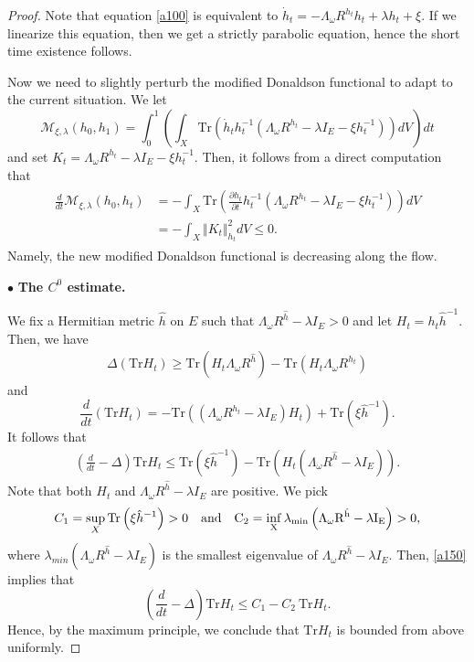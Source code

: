 \documentclass[11pt]{amsart}
\numberwithin{equation}{section}
\theoremstyle{remark}
\newcommand{\pa}{\partial}
\newcommand{\M}{{\mathcal M}}
\newcommand{\lb}{\left (}
\newcommand{\rb}{\right )}
\newcommand{\tr}{\text{Tr}}
\begin{document}
\begin{proof}
Note that equation \eqref{a100} is equivalent to $\dot h_t=-\Lambda_\omega R^{h_t}h_t+\lambda h_t+\xi$. If we linearize this equation, then we get a strictly parabolic equation, hence the short time existence follows.

Now we need to slightly perturb the modified Donaldson functional to adapt to the current situation. We let
\[
\M_{\xi,\lambda}\lb h_0,h_1\rb=\int_0^1 \lb \int_X \tr \lb \dot h_t h_t^{-1}\lb \Lambda_\omega R^{h_t}-\lambda I_E-\xi h_t^{-1}\rb\rb dV\rb dt
\]
and set $K_t=\Lambda_\omega R^{h_t}-\lambda I_E-\xi h_t^{-1}$. Then, it follows from a direct computation that
\begin{align*}
\begin{split}
\frac{d}{dt}\M_{\xi,\lambda}\lb h_0,h_t\rb & =-\int_X \tr\lb\frac{\pa h_t}{\pa t}h_t^{-1} \lb \Lambda_\omega R^{h_t}-\lambda I_E-\xi h_t^{-1}\rb\rb dV \\
& =-\int_X \Vert K_t\Vert_{h_t}^2 dV\leq 0.
\end{split}
\end{align*}
Namely, the new modified Donaldson functional is decreasing along the flow.

\medskip
\noindent $\bullet$  \textbf{The $C^0$ estimate.}

\smallskip

We fix a Hermitian metric $\hat h$ on $E$ such that $\Lambda_\omega R^{\hat h}-\lambda I_E>0$ and let $H_t=h_t\hat h^{-1}$. Then, we have
\begin{eqnarray}\label{a140}
\Delta \lb \tr H_t\rb \geq \tr \lb H_t \Lambda_\omega R^{\hat h}\rb-\tr \lb H_t \Lambda_\omega R^{h_t}\rb
\end{eqnarray}
and
\[
\frac{d}{dt} \lb \tr H_t\rb =-\tr \lb \lb\Lambda_\omega R^{h_t}-\lambda I_E\rb H_t \rb+\tr\lb \xi \hat h^{-1}\rb.
\]
It follows that
\begin{eqnarray}\label{a150}
\lb \frac{d}{dt}-\Delta\rb\tr H_t\leq \tr\lb \xi  \hat h^{-1}\rb-\tr \lb H_t \lb\Lambda_\omega R^{\hat h}-\lambda I_E\rb\rb.
\end{eqnarray}
Note that both $H_t$ and $\Lambda_\omega R^{\hat h}-\lambda I_E$ are positive. We pick
\[C_1=\sup_X \tr\lb \xi  \hat h^{-1}\rb>0 \quad \rm{and} \quad C_2=\inf_X \lambda_{min}\lb \Lambda_\omega R^{\hat h}-\lambda I_E\rb>0,\]
where $\lambda_{min}\lb \Lambda_\omega R^{\hat h}-\lambda I_E\rb$ is the smallest eigenvalue of $\Lambda_\omega R^{\hat h}-\lambda I_E$. Then,  \eqref{a150} implies that
\[
\lb \frac{d}{dt}-\Delta\rb\tr H_t\leq C_1-C_2 \ \!\tr H_t.
\]
Hence, by the maximum principle,  we conclude  that $\tr H_t$ is bounded from above uniformly.


\end{proof}
\end{document}
